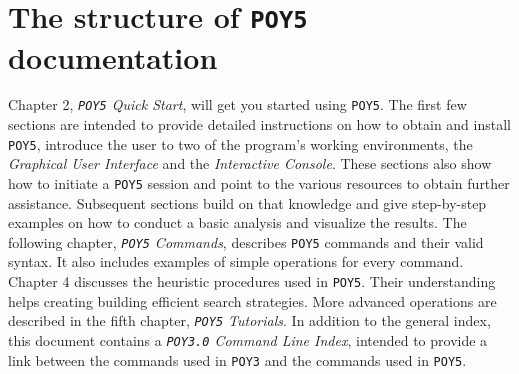 \documentclass[11pt]{book}
\newcommand{\commandstyle}[1]{\texttt{#1}}
\newcommand{\poy}{\commandstyle{POY5}\xspace}
\begin{document}
\section{The structure of \poy documentation}
Chapter 2, \emph{\poy Quick Start}, will get you started using \poy. The first few sections are intended to provide detailed instructions on how to obtain and install \poy, introduce the user to two of the program's working environments, the \emph{Graphical User Interface} and the \emph{Interactive Console}. These sections also show how to initiate a \poy session and point to the various resources to obtain further assistance. Subsequent sections build on that knowledge and give step-by-step examples on how to conduct a basic analysis and visualize the results. The following chapter, \emph{\poy Commands}, describes \poy commands and their valid syntax. It also includes examples of simple operations for every command. Chapter 4 discusses the heuristic procedures used in \poy. Their understanding helps creating building efficient search strategies. More advanced operations are described in the fifth chapter, \emph{\poy Tutorials}. In addition to the general index, this document contains a \emph{\texttt{POY3.0} Command Line Index}, intended to provide a link between the commands used in \texttt{POY3} and the commands used in \poy. 
\end{document}

